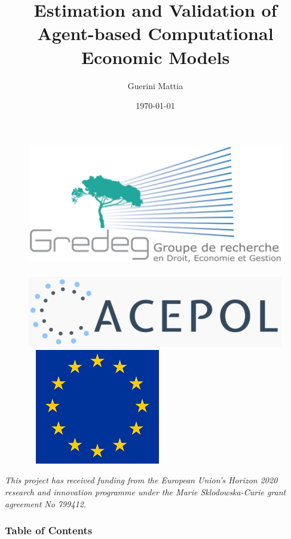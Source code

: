 \documentclass[10pt]{beamer}
\title{Estimation and Validation of \\ Agent-based Computational Economic Models}
\author{Guerini Mattia}
\institute{Université Côte d'Azur - GREDEG}
\date{\today}
\begin{document}
\begin{frame}
	\vspace{-.5cm}
	\begin{figure}[htbp] \centering \hfill 
		\includegraphics[scale=.10]{logo/gredeg.png} ~
		\includegraphics[scale=.15]{logo/acepol.png} ~
		\includegraphics[scale=.17]{logo/EUflag.png}
	\end{figure}

	\vspace{-2cm}
	\maketitle

	\vspace{-2.5cm}
	\textit{\scriptsize This project has received funding from the European Union’s Horizon 2020 research and innovation programme under the Marie Sklodowska-Curie grant agreement No 799412.}
\end{frame}


\begin{frame}[c]\frametitle{Table of Contents}
	\tableofcontents[hideallsubsections]
\end{frame}
\end{document}
